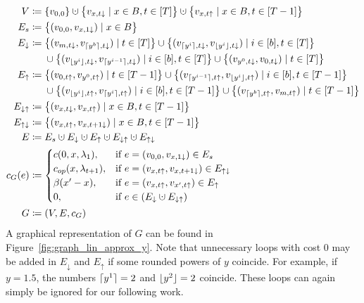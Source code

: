\begin{align*}
	V&\coloneqq\{v_{0,0}\}\dotcup\bigl\{v_{x,t\downarrow}\mid x\in B,t\in[T]\bigr\}\dotcup\bigl\{v_{x,t\uparrow}\mid x\in B, t\in[T-1]\bigr\}\\
	E_s&\coloneqq\bigl\{(v_{0,0},v_{x,1\downarrow})\mid x\in B\bigr\}\\
	E_\downarrow&\coloneqq\bigl\{(v_{m,t\downarrow},v_{\ceil{y^b},t\downarrow})\mid t\in[T]\bigr\}\cup\bigl\{(v_{\ceil{y^i},t\downarrow},v_{\floor{y^{i}},t\downarrow})\mid i\in[b],t\in[T]\bigr\}\\
	&\phantom{{}\coloneqq{}}\cup\bigl\{(v_{\floor{y^i},t\downarrow},v_{\ceil{y^{i-1}},t\downarrow})\mid i\in[b],t\in[T]\bigr\}\cup\bigl\{(v_{y^0,t\downarrow},v_{0,t\downarrow})\mid t\in[T]\bigr\}\\
	E_\uparrow&\coloneqq\bigl\{(v_{0,t\uparrow},v_{y^0,t\uparrow})\mid t\in[T-1]\bigr\}\cup\bigl\{(v_{\ceil{y^{i-1}},t\uparrow},v_{\floor{y^i},t\uparrow})\mid i\in[b],t\in[T-1]\bigr\}\\
	&\phantom{{}\coloneqq{}}\cup\bigl\{(v_{\floor{y^i},t\uparrow},v_{\ceil{y^i},t\uparrow})\mid i\in[b],t\in[T-1]\bigr\}\cup\bigl\{(v_{\ceil{y^b},t\uparrow},v_{m,t\uparrow})\mid t\in[T-1]\bigr\}\\
	E_{\downarrow\uparrow}&\coloneqq\bigl\{(v_{x,t\downarrow},v_{x,t\uparrow})\mid x\in B,t\in[T-1]\bigr\}\\
	E_{\uparrow\downarrow}&\coloneqq\bigl\{(v_{x,t\uparrow},v_{x,t+1\downarrow})\mid x\in B,t\in[T-1]\bigr\}\\
	E&\coloneqq E_s\dotcup E_\downarrow\dotcup E_\uparrow\dotcup E_{\downarrow\uparrow}\dotcup E_{\uparrow\downarrow}\\
	c_G(e)&\coloneqq
	\begin{cases}
		\costs(0,x,\lambda_1), & \text{if $e=(v_{0,0},v_{x,1\downarrow})\in E_s$}\\
		\opcosts(x,\lambda_{t+1}), & \text{if $e=(v_{x,t\uparrow},v_{x,t+1\downarrow})\in E_{\uparrow\downarrow}$}\\
		\beta(x'-x), & \text{if $e=(v_{x,t\uparrow},v_{x',t\uparrow})\in E_\uparrow$}\\
		0, & \text{if $e\in(E_\downarrow\dotcup E_{\downarrow\uparrow})$}
	\end{cases}\\
	G&\coloneqq(V,E,c_G)
\end{align*}
A graphical representation of $G$ can be found in Figure~\ref{fig:graph_lin_approx_y}. Note that unnecessary loops with cost $0$ may be added in $E_\downarrow$ and $E_\uparrow$ if some rounded powers of $y$ coincide. For example, if $y=1.5$, the numbers $\lceil y^1\rceil=2$ and $\lfloor y^2\rfloor=2$ coincide. These loops can again simply be ignored for our following work. 
